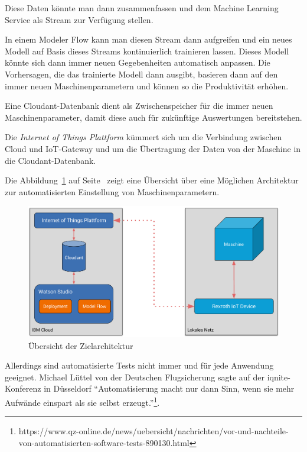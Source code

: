 Diese Daten könnte man dann zusammenfassen und dem Machine Learning Service als Stream zur Verfügung stellen.

In einem Modeler Flow kann man diesen Stream dann aufgreifen und ein neues Modell auf Basis dieses Streams
kontinuierlich trainieren lassen. Dieses Modell könnte sich dann immer neuen Gegebenheiten automatisch anpassen. Die
Vorhersagen, die das trainierte Modell dann ausgibt, basieren dann auf den immer neuen Maschinenparametern und können
so die Produktivität erhöhen.

Eine Cloudant-Datenbank dient als Zwischenspeicher für die immer neuen Maschinenparameter, damit diese auch für
zukünftige Auswertungen bereitstehen.

Die \textit{Internet of Things Plattform} kümmert sich um die Verbindung zwischen Cloud und IoT-Gateway und um die
Übertragung der Daten von der Maschine in die Cloudant-Datenbank.

Die Abbildung~\ref{fig:ausblick_uebersicht} auf Seite~\pageref{fig:ausblick_uebersicht} zeigt eine Übersicht über eine
Möglichen Architektur zur automatisierten Einstellung von Maschinenparametern.

\begin{figure}[h]
    \centering
    \includegraphics[width=\textwidth]{images/kapitel_6/architektur_uebersicht.pdf}
    \caption{Übersicht der Zielarchitektur}
    \label{fig:ausblick_uebersicht}
\end{figure}

Allerdings sind automatisierte Tests nicht immer und für jede Anwendung geeignet. Michael Lüttel von der Deutschen
Flugsicherung sagte auf der iqnite-Konferenz in Düsseldorf \enquote{Automatisierung macht nur dann Sinn, wenn sie mehr
Aufwände einspart als sie selbst
erzeugt.}\footnote{https://www.qz-online.de/news/uebersicht/nachrichten/vor-und-nachteile-von-automatisierten-software-tests-890130.html}.

